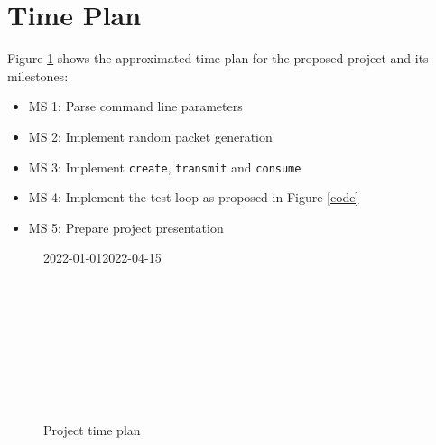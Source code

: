 \documentclass[a4paper,english,10pt]{tumarticle}
\begin{document}
\section{Time Plan}

Figure \ref{timePlan} shows the approximated time plan for the proposed project and its milestones:
\begin{itemize}
    \setlength{\itemsep}{1pt}
	\setlength{\parskip}{0pt}
	\setlength{\parsep}{0pt}
	\item MS 1: Parse command line parameters
	\item MS 2: Implement random packet generation
	\item MS 3: Implement \texttt{create}, \texttt{transmit} and \texttt{consume}
	\item MS 4: Implement the test loop as proposed in Figure \ref{code}
    \item MS 5: Prepare project presentation
\end{itemize}


\begin{figure}[htb]
	\centering
	\begin{ganttchart}[
		hgrid,
		vgrid,
		x unit=0.13cm,
		y unit chart=0.5cm,
		time slot format=isodate
	]{2022-01-01}{2022-04-15}
		 \\
		\\
		\\
		\\
		\\
		\\
		\\
		\\
		\\
	\end{ganttchart}
	\caption{Project time plan}
	\label{timePlan}
\end{figure}
\end{document}
